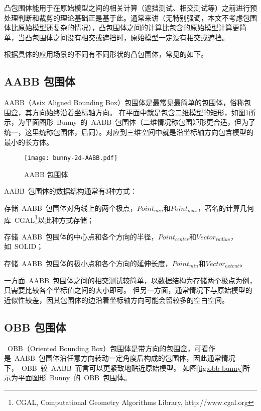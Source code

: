 凸包围体能用于在原始模型之间的相关计算（遮挡测试、相交测试等）之前进行预处理判断和裁剪的理论基础正是基于此。通常来讲（无特别强调，本文不考虑包围体比原始模型还复杂的情况），凸包围体之间的计算比包含的原始模型计算更简单，当凸包围体之间没有相交或遮挡时，原始模型一定没有相交或遮挡。

根据具体的应用场景的不同有不同形状的凸包围体，常见的如下。

\subsection{AABB 包围体}

AABB（Asix Aligned Bounding Box）包围体是最常见最简单的包围体，俗称包围盒，其方向始终沿着坐标轴方向\cite{bergen1997efficient}。
在平面中就是包含二维模型的矩形，如图\ref{fig:aabb-bunny}所示，为平面图形~Bunny~的~AABB~包围体（二维情况称包围矩形更合适，但为了统一，这里统称包围体，后同）。对应到三维空间中就是沿坐标轴方向包含模型的最小的长方体。

\begin{figure}[H] %
  \centering
  \texttt{[image: bunny-2d-AABB.pdf]}
  \caption{AABB 包围体}
  \label{fig:aabb-bunny}
\end{figure}

AABB~包围体的数据结构通常有3种方式：
\begin{inparaenum}[(1)]
\item 存储~AABB~包围体对角线上的两个极点，$Point_{min}$和$Point_{max}$，著名的计算几何库~CGAL\footnote{CGAL, Computational Geometry Algorithms Library, http://www.cgal.org}以此种方式存储；
\item 存储~AABB~包围体的中心点和各个方向的半径，$Point_{center}$和$Vector_{radius}$，如~SOLID\cite{bergen1997efficient}；
\item 存储~AABB~包围体的极小点和各个方向的延伸长度\cite{ericson2005real}，$Point_{min}$和$Vector_{extent}$。
\end{inparaenum} 

一方面~AABB~包围体之间的相交测试较简单，以数据结构为存储两个极点为例，只需要比较各个坐标值之间的大小即可。
但另一方面，通常情况下与原始模型的近似性较差，因其包围体的边沿着坐标轴方向可能会留较多的空白空间。

\subsection{OBB 包围体}

~OBB（Oriented Bounding Box）包围体是带方向的包围盒，可看作是~AABB~包围体沿任意方向转动一定角度后构成的包围体，因此通常情况下，~OBB~较~AABB~而言可以更紧致地贴近原始模型。
如图\ref{fig:obb-bunny}所示为平面图形~Bunny~的~OBB~包围体。

